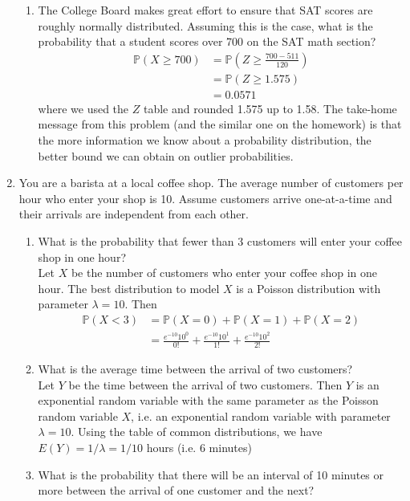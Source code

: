 \documentclass[12pt]{article}
\def\P{{\mathbb P}}
\begin{document}
\begin{enumerate}
\begin{enumerate}
\item The College Board makes great effort to ensure that SAT scores are roughly normally distributed. Assuming this is the case, what is the probability that a student scores over 700 on the SAT math section?\\

\begin{align*}
\P(X \geq 700) &= \P\left( Z \geq \frac{700 - 511}{120} \right)\\
&= \P( Z \geq 1.575) \\
&= 0.0571
\end{align*}
where we used the $Z$ table and rounded 1.575 up to 1.58. The take-home message from this problem (and the similar one on the homework) is that the more information we know about a probability distribution, the better bound we can obtain on outlier probabilities.
\end{enumerate}

\item You are a barista at a local coffee shop. The average number of customers per hour who enter your shop is 10. Assume customers arrive one-at-a-time and their arrivals are independent from each other.
\begin{enumerate}
\item What is the probability that fewer than 3 customers will enter your coffee shop in one hour?\\

Let $X$ be the number of customers who enter your coffee shop in one hour. The best distribution to model $X$ is a Poisson distribution with parameter $\lambda = 10$. Then
\begin{align*}
\P(X < 3) &= \P(X = 0) + \P(X = 1) + \P(X = 2) \\
&= \frac{e^{-10} 10^0}{0!} + \frac{e^{-10} 10^1}{1!} + \frac{e^{-10} 10^2}{2!}
\end{align*}

\item What is the average time between the arrival of two customers?\\

Let $Y$ be the time between the arrival of two customers. Then $Y$ is an exponential random variable with the same parameter as the Poisson random variable $X$, i.e. an exponential random variable with parameter $\lambda = 10$. Using the table of common distributions, we have $E(Y) = 1/\lambda = 1/10$ hours (i.e. 6 minutes)

\item What is the probability that there will be an interval of 10 minutes or more between the arrival of one customer and the next?\\


\end{enumerate}
\end{enumerate}
\end{document}
